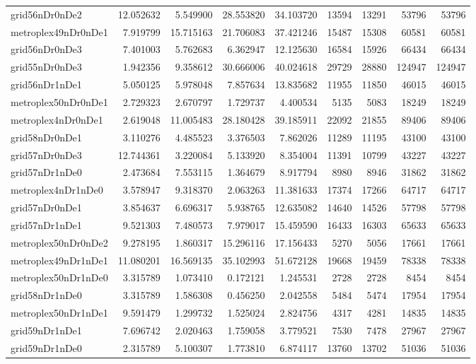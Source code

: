 \begin{longtable}{|l|r|r|r|r|r|r|r|r|}
grid56nDr0nDe2 & 12.052632 & 5.549900 & 28.553820 & 34.103720 & 13594 & 13291 & 53796 & 53796 \\
metroplex49nDr0nDe1 & 7.919799 & 15.715163 & 21.706083 & 37.421246 & 15487 & 15308 & 60581 & 60581 \\
grid56nDr0nDe3 & 7.401003 & 5.762683 & 6.362947 & 12.125630 & 16584 & 15926 & 66434 & 66434 \\
grid55nDr0nDe3 & 1.942356 & 9.358612 & 30.666006 & 40.024618 & 29729 & 28880 & 124947 & 124947 \\
grid56nDr1nDe1 & 5.050125 & 5.978048 & 7.857634 & 13.835682 & 11955 & 11850 & 46015 & 46015 \\
metroplex50nDr0nDe1 & 2.729323 & 2.670797 & 1.729737 & 4.400534 & 5135 & 5083 & 18249 & 18249 \\
metroplex4nDr0nDe1 & 2.619048 & 11.005483 & 28.180428 & 39.185911 & 22092 & 21855 & 89406 & 89406 \\
grid58nDr0nDe1 & 3.110276 & 4.485523 & 3.376503 & 7.862026 & 11289 & 11195 & 43100 & 43100 \\
grid57nDr0nDe3 & 12.744361 & 3.220084 & 5.133920 & 8.354004 & 11391 & 10799 & 43227 & 43227 \\
grid57nDr1nDe0 & 2.473684 & 7.553115 & 1.364679 & 8.917794 & 8980 & 8946 & 31862 & 31862 \\
metroplex4nDr1nDe0 & 3.578947 & 9.318370 & 2.063263 & 11.381633 & 17374 & 17266 & 64717 & 64717 \\
grid57nDr0nDe1 & 3.854637 & 6.696317 & 5.938765 & 12.635082 & 14640 & 14526 & 57798 & 57798 \\
grid57nDr1nDe1 & 9.521303 & 7.480573 & 7.979017 & 15.459590 & 16433 & 16303 & 65633 & 65633 \\
metroplex50nDr0nDe2 & 9.278195 & 1.860317 & 15.296116 & 17.156433 & 5270 & 5056 & 17661 & 17661 \\
metroplex49nDr1nDe1 & 11.080201 & 16.569135 & 35.102993 & 51.672128 & 19668 & 19459 & 78338 & 78338 \\
metroplex50nDr1nDe0 & 3.315789 & 1.073410 & 0.172121 & 1.245531 & 2728 & 2728 & 8454 & 8454 \\
grid58nDr1nDe0 & 3.315789 & 1.586308 & 0.456250 & 2.042558 & 5484 & 5474 & 17954 & 17954 \\
metroplex50nDr1nDe1 & 9.591479 & 1.299732 & 1.525024 & 2.824756 & 4317 & 4281 & 14835 & 14835 \\
grid59nDr1nDe1 & 7.696742 & 2.020463 & 1.759058 & 3.779521 & 7530 & 7478 & 27967 & 27967 \\
grid59nDr1nDe0 & 2.315789 & 5.100307 & 1.773810 & 6.874117 & 13760 & 13702 & 51036 & 51036 \\

\end{longtable}
